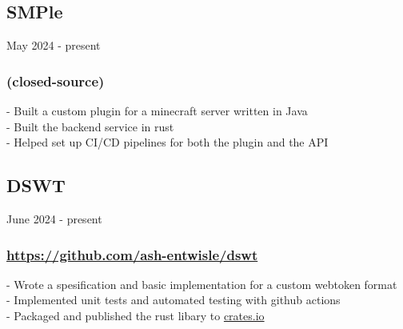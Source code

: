 \subsection{SMPle} May 2024 - present \\
\subsubsection{(closed-source)}
-\:  Built a custom plugin for a minecraft server written in Java \\
-\:  Built the backend service in rust \\
-\:  Helped set up CI/CD pipelines for both the plugin and the API \\

\subsection{DSWT} June 2024 - present \\
\subsubsection{\href{https://github.com/ash-entwisle/dswt}{https://github.com/ash-entwisle/dswt} }
-\:  Wrote a spesification and basic implementation for a custom webtoken format \\
-\:  Implemented unit tests and automated testing with github actions \\
-\:  Packaged and published the rust libary to \href{https://crates.io/}{crates.io} \\ 
